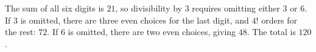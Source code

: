 The sum of all six digits is $21$, so divisibility by $3$ requires omitting either $3$ or $6$. If $3$ is omitted, there are three even choices for the last digit, and $4!$ orders for the rest: $72$. If $6$ is omitted, there are two even choices, giving $48$. The total is $\boxed{120}$.

